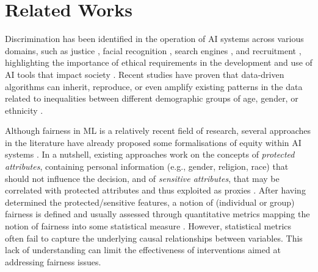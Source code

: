 \documentclass[letterpaper]{article} %
\begin{document}
\section{Related Works}

Discrimination has been identified in the operation of AI systems across various domains, such as justice \cite{ProPublica2}, facial recognition \cite{pmlr-v81-buolamwini18a}, search engines \cite{10.1145/2702123.2702520}, and recruitment \cite{Leicht-Deobald}, highlighting the importance of ethical requirements in the development and use of AI tools that impact society \cite{bostrom2020ethical}.
%
Recent studies have proven that data-driven algorithms can inherit, reproduce, or even amplify existing patterns in the data related to inequalities between different demographic groups of age, gender, or ethnicity \cite{chouldechova2018frontiers,10.1145/2090236.2090255}. 

Although fairness in ML \cite{Barocas2018FairnessAM} is a relatively recent field of research, several approaches in the literature have already proposed some formalisations of equity within AI systems \cite{wang2022brief,10.1145/3494672}.
%
In a nutshell, existing approaches work on the concepts of \emph{protected attributes}, containing personal information (e.g., gender, religion, race) that should not influence the decision, and of \emph{sensitive attributes}, that may be correlated with protected attributes and thus exploited as proxies \cite{QuyRIZN22,NuenenASC20,Wiggins2020calculating}.
%
After having determined the protected/sensitive features, a notion of (individual or group) fairness is defined and usually assessed through quantitative metrics mapping the notion of fairness into some statistical measure \cite[e.g., disparate impact, equal opportunity; see][for further details]{wang2022brief}. However, statistical metrics often fail to capture the underlying causal relationships between variables. 
This lack of understanding can limit the effectiveness of interventions aimed at addressing fairness issues. 
\end{document}
